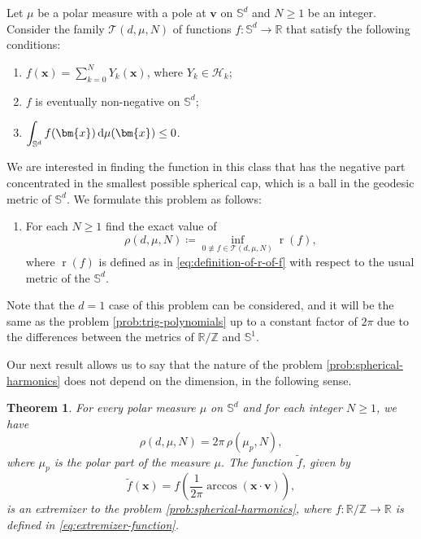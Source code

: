 \documentclass[reqno, a4paper]{amsart}
\def\R{\mathbb{R}}
\def\SS{\mathbb{S}}
\def\T{\mathbb{R}/\mathbb{Z}}
\renewcommand{\d}{\text{\rm d}}
\newcommand{\Sd}{\mathbb{S}^d}
\newcommand{\x}{{\bm x}}
\renewcommand{\v}{{\bm v}}
\newcommand{\wt}{\widetilde}
\renewcommand{\r}{\operatorname{r}}
\theoremstyle{plain}
\newtheorem{theorem}{Theorem}
\theoremstyle{definition}
\theoremstyle{remarkstyle}
\numberwithin{equation}{section}
\begin{document}
Let $\mu$ be a polar measure with a pole at $\v$ on $\Sd$ and $N\geq 1$ be an integer. Consider the family $\mathcal{T}(d, \mu, N)$ of functions $f:\Sd \to \R$ that satisfy the following conditions:
\begin{enumerate}
    \item $f(\bm{x})=\sum_{k=0}^N Y_k(\bm{x})$, where $Y_k\in \mathscr{H}_k$;
    \item $f$ is eventually non-negative on $\Sd$;
    \item $\displaystyle \int_{\Sd} f(\bm{x})\, \d\mu(\bm{x})\leq 0$.
\end{enumerate}
We are interested in finding the function in this class that has the negative part concentrated in the smallest possible spherical cap, which is a ball in the geodesic metric of $\Sd$. We formulate this problem as follows: 
\begin{enumerate}[label=\textbf{(P\arabic*)}, ref=(P\arabic*), start=2]
    \item \label{prob:spherical-harmonics} For each $N\geq 1$ find the exact value of
    \begin{equation*}
    \rho(d, \mu, N)\coloneqq \inf_{0\not \equiv f \in \mathcal{T}(d, \mu, N)} \r(f),
    \end{equation*}
    where $\r(f)$ is defined as in \eqref{eq:definition-of-r-of-f} with respect to the usual metric of the $\Sd$.
\end{enumerate}

\noindent Note that the $d=1$ case of this problem can be considered, and it will be the same as the problem \ref{prob:trig-polynomials} up to a constant factor of $2\pi$ due to the differences between the metrics of $\T$ and $\SS^1$.

\medskip

Our next result allows us to say that the nature of the problem \ref{prob:spherical-harmonics} does not depend on the dimension, in the following sense. 

\begin{theorem}\label{thm:reduction-to-dimension-one}
    For every polar measure $\mu$ on $\Sd$ and for each integer $N\geq 1$, we have
    \begin{equation*}
        \rho(d, \mu, N)= 2\pi\,\rho(\mu_p, N),
    \end{equation*}
    where $\mu_p$ is the polar part of the measure $\mu$. The function $\widetilde{f}$, given by
    \begin{equation*}
        \wt f(\x)= f\left(\frac{1}{2\pi} \arccos(\x\cdot\v)\right),
    \end{equation*}
is an extremizer to the problem \textnormal{\ref{prob:spherical-harmonics}}, where $f:\T\to \R$ is defined in \eqref{eq:extremizer-function}.
\end{theorem}
\end{document}
